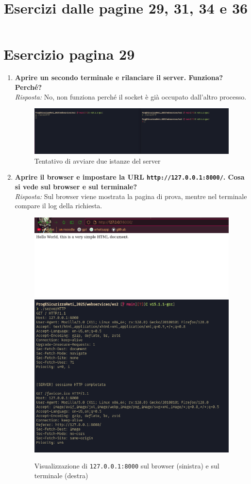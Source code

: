 \documentclass[a4paper,12pt]{article}
\title{Esercizi dalle pagine 29, 31, 34 e 36}
\author{}
\date{}
\begin{document}
\maketitle

\section*{Esercizio pagina 29}
\begin{enumerate}
  \item \textbf{Aprire un secondo terminale e rilanciare il server. Funziona? Perché?}\\
    \emph{Risposta:} No, non funziona perché il socket è già occupato dall'altro processo.
    \begin{figure}[h]
      \centering
      \includegraphics[width=0.7\linewidth]{due_server.png}
      \caption{Tentativo di avviare due istanze del server}
    \end{figure}

  \item \textbf{Aprire il browser e impostare la URL \texttt{http://127.0.0.1:8000/}. Cosa si vede sul browser e sul terminale?}\\
    \emph{Risposta:} Sul browser viene mostrata la pagina di prova, mentre nel terminale compare il log della richiesta.
    \begin{figure}[h]
      \centering
      \includegraphics[width=0.45\linewidth]{browser1.png}
      \includegraphics[width=0.45\linewidth]{terminale1.png}
      \caption{Visualizzazione di \texttt{127.0.0.1:8000} sul browser (sinistra) e sul terminale (destra)}
    \end{figure}


\end{enumerate}
\end{document}
